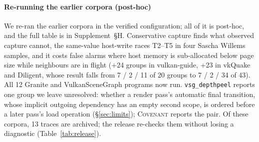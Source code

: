 \documentclass[acmtog,anonymous,review]{acmart}
\newcommand{\sys}{\textsc{Covenant}\xspace}
\newcommand{\code}[1]{\texttt{#1}}
\newcommand{\supp}[1]{Supplement~\S#1}
\begin{document}
\begin{table}[t]
\caption{Earlier studies: timing precision of the checker frozen before each study, on code it had never been run on. Groups: report
groups true / technicality / false alarm; ``true'' and ``actionable'' (true or technicality) are shares of groups.
Causes: distinct root causes, true / technicality / false alarm. Raw: share of raw diagnostics that are true.}
\label{tab:engines}
\small
{}
\end{table}

\paragraph{Re-running the earlier corpora (post-hoc)}
\label{sec:eval-posthoc}
We re-ran the earlier corpora in the verified configuration; all of it is post-hoc, and the full table is in
\supp{H}. Conservative capture finds what observed capture cannot, the same-value host-write races T2--T5 in four
Sascha Willems samples, and it costs false alarms where host memory is sub-allocated below page size while neighbours
are in flight (+24 groups in vulkan-guide, +23 in vkQuake and Diligent, whose result falls from 7 / 2 / 11 of 20
groups to 7 / 2 / 34 of 43). All 12 Granite and VulkanSceneGraph programs now run. \code{vsg\_depthpeel} reports one
group we leave unresolved: whether a render pass's automatic final transition, whose implicit outgoing dependency has
an empty second scope, is ordered before a later pass's load operation (\S\ref{sec:limits}); \sys reports the pair.
Of these corpora, 13 traces are archived; the release re-checks them without losing a diagnostic
(Table~\ref{tab:release}).
\end{document}
